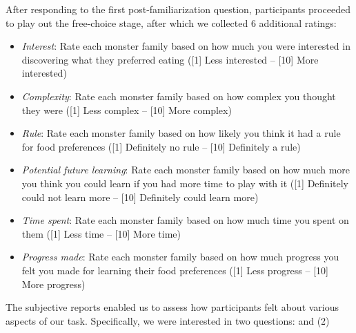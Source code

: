 \begin{subappendices}
After responding to the first post-familiarization question, participants proceeded to play out the free-choice stage, after which we collected 6 additional ratings: 

\begin{itemize}
\item \textit{Interest}: Rate each monster family based on how much you were interested in discovering what they preferred eating ([1] Less interested -- [10] More interested)
\item \textit{Complexity}: Rate each monster family based on how complex you thought they were ([1] Less complex -- [10] More complex)
\item \textit{Rule}: Rate each monster family based on how likely you think it had a rule for food preferences ([1] Definitely no rule -- [10] Definitely a rule)
\item \textit{Potential future learning}: Rate each monster family based on how much more you think you could learn if you had more time to play with it ([1] Definitely could not learn more -- [10] Definitely could learn more)
\item \textit{Time spent}: Rate each monster family based on how much time you spent on them ([1] Less time -- [10] More time)
\item \textit{Progress made}: Rate each monster family based on how much progress you felt you made for learning their food preferences ([1] Less progress -- [10] More progress)
\end{itemize}

The subjective reports enabled us to assess how participants felt about various aspects of our task. Specifically, we were interested in two questions: and (2) 


\end{subappendices}
